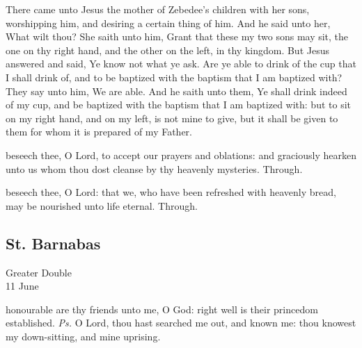 
 There came unto Jesus the mother of Zebedee's children with her sons, worshipping him, and desiring a certain thing of him. And he said unto her, What wilt thou? She saith unto him, Grant that these my two sons may sit, the one on thy right hand, and the other on the left, in thy kingdom. But Jesus answered and said, Ye know not what ye ask. Are ye able to drink of the cup that I shall drink of, and to be baptized with the baptism that I am baptized with? They say unto him, We are able. And he saith unto them, Ye shall drink indeed of my cup, and be baptized with the baptism that I am baptized with: but to sit on my right hand, and on my left, is not mine to give, but it shall be given to them for whom it is prepared of my Father.


\secret
{} beseech thee, O Lord, to accept our prayers and oblations: and graciously hearken unto us whom thou dost cleanse by thy heavenly mysteries. Through.


\postcommunion
{} beseech thee, O Lord: that we, who have been refreshed with heavenly bread, may be nourished unto life eternal. Through.




\subsection{St. Barnabas}
\begin{inhead}
    {Greater Double\\
11 June}
\end{inhead}


\introit
{} honourable are thy friends unto me, O God: right well is their princedom established. \textit{Ps.} O Lord, thou hast searched me out, and known me: thou knowest my down-sitting, and mine uprising.

